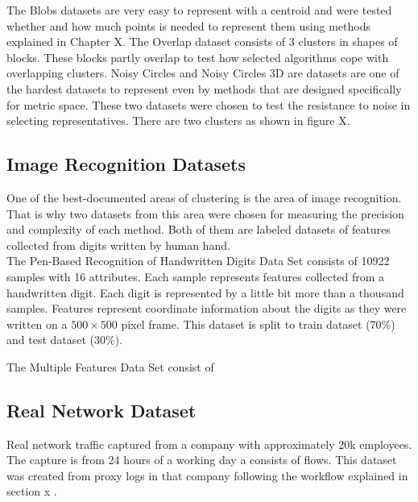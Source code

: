 \documentclass[thesis=B,english]{FITthesis}[2012/10/20]
\begin{document}
The Blobs datasets are very easy to represent with a centroid and were tested whether and how much points is needed to represent them using methods explained in Chapter X.  The Overlap dataset consists of 3 clusters in shapes of blocks.
These blocks partly overlap to test how selected algorithms cope with overlapping clusters. Noisy Circles and Noisy Circles 3D are datasets are one of the hardest datasets to represent even by methods that are designed specifically for metric space.
These two datasets were chosen to test the resistance to noise in selecting representatives.
There are two clusters as shown in figure X. 

\subsection{Image Recognition Datasets}
One of the best-documented areas of clustering is the area of image recognition.
That is why two datasets from this area were chosen for measuring the precision and complexity of each method.
Both of them are labeled datasets of features collected from digits written by human hand. \\

The Pen-Based Recognition of Handwritten Digits Data Set \cite{dua1998pendigit} consists of 10922 samples with 16 attributes.
Each sample represents features collected from a handwritten digit.
Each digit is represented by a little bit more than a thousand samples.
Features represent coordinate information about the digits as they were written on a $500\times500$ pixel frame.
This dataset is split to train dataset (70\%) and test dataset (30\%).

The Multiple Features Data Set \cite{dua1998pendigit} consist of  

\subsection{Real Network Dataset}
Real network traffic captured from a company with approximately 20k employees.
The capture is from 24 hours of a working day a consists of  flows.
This dataset was created from proxy logs in that company following the workflow explained in section x . \\

\end{document}
